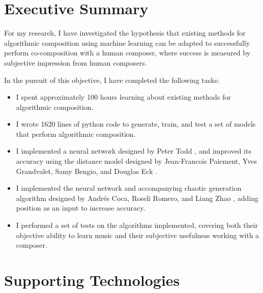 \documentclass[ author={Stephen Livermore-Tozer},
				supervisor={Dr. Peter Flach},
				degree={MEng},
				title={Algorithmic Co-composition Using Machine Learning},
				subtitle={},
				type={research},
				year={2016} ]{dissertation}
\begin{document}
	
	\maketitle
	
	\frontmatter
	
	\makedecl
	
	\tableofcontents
	\listoffigures
	\listoftables
	\listofalgorithms
	\lstlistoflistings	
	
	
	\chapter*{Executive Summary}
	
	For my research, I have investigated the hypothesis that existing methods for algorithmic composition using machine learning can be adapted to successfully perform co-composition with a human composer, where success is measured by subjective impression from human composers. 
	
	In the pursuit of this objective, I have completed the following tasks:
	\begin{itemize}
		\item I spent approximately 100 hours learning about existing methods for algorithmic composition.
		\item I wrote 1620 lines of python code to generate, train, and test a set of models that perform algorithmic composition.
		\item I implemented a neural network designed by Peter Todd \cite{todd1989connectionist}, and improved its accuracy using the distance model designed by Jean-Francois Paiement, Yves Grandvalet, Samy Bengio, and Douglas Eck \cite{paiement2007generative}.
		\item I implemented the neural network and accompanying chaotic generation algorithm designed by Andr\'es Coca, Roseli Romero, and Liang Zhao \cite{coca2011generation}, adding position as an input to increase accuracy.
		\item I performed a set of tests on the algorithms implemented, covering both their objective ability to learn music and their subjective usefulness working with a composer.
	\end{itemize}
	
	
	
	\chapter*{Supporting Technologies}
	
\end{document}
